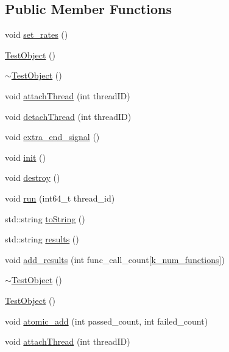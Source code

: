 \subsection*{Public Member Functions}
\begin{DoxyCompactItemize}
\item 
void \hyperlink{class_test_object_adfad75ad3f6c014f68ff2cdc4e752fc9}{set\+\_\+rates} ()
\item 
\hyperlink{class_test_object_a3d0036f18982129567596b06d72087b6}{Test\+Object} ()
\item 
\hyperlink{class_test_object_a3262a3065422e5ebd007e38c4c50d01f}{$\sim$\+Test\+Object} ()
\item 
void \hyperlink{class_test_object_a9aec85cd402d269ccf81cca9dcb4c31e}{attach\+Thread} (int thread\+I\+D)
\item 
void \hyperlink{class_test_object_acf21dd1257cae9a96c4ea39233929027}{detach\+Thread} (int thread\+I\+D)
\item 
void \hyperlink{class_test_object_a7c5bccd9eb5900850169d39a22db8c53}{extra\+\_\+end\+\_\+signal} ()
\item 
void \hyperlink{class_test_object_acc6255f8f3e0f9e1a09955cc7f53caff}{init} ()
\item 
void \hyperlink{class_test_object_a30dbc74cb72669dd4d0cec14baa92bc9}{destroy} ()
\item 
void \hyperlink{class_test_object_ae0ac39cc52730e2c60961ea495b34550}{run} (int64\+\_\+t thread\+\_\+id)
\item 
std\+::string \hyperlink{class_test_object_af09564f241ed447b17ab16ef751eef8e}{to\+String} ()
\item 
std\+::string \hyperlink{class_test_object_a39bb7ef595355ab7459e992b85b045d8}{results} ()
\item 
void \hyperlink{class_test_object_a30655b96ad192de48772ad45036a38a3}{add\+\_\+results} (int func\+\_\+call\+\_\+count\mbox{[}\hyperlink{class_test_object_a2eafe110f35fcae7fa739cd52f02392a}{k\+\_\+num\+\_\+functions}\mbox{]})
\item 
\hyperlink{class_test_object_a3262a3065422e5ebd007e38c4c50d01f}{$\sim$\+Test\+Object} ()
\item 
\hyperlink{class_test_object_a3d0036f18982129567596b06d72087b6}{Test\+Object} ()
\item 
void \hyperlink{class_test_object_afeabc840ed3d84b34be1131f7ec4c2e0}{atomic\+\_\+add} (int passed\+\_\+count, int failed\+\_\+count)
\item 
void \hyperlink{class_test_object_a9aec85cd402d269ccf81cca9dcb4c31e}{attach\+Thread} (int thread\+I\+D)

\end{DoxyCompactItemize}
